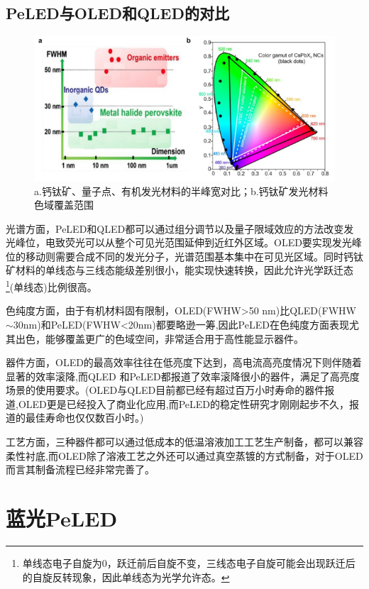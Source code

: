 \documentclass{phyasgn}\usepackage{nag}
\begin{document}
\subsection{PeLED与OLED和QLED的对比}
\begin{figure}[H]
	\centering
	\hspace{2em}\includegraphics[width=.8\linewidth]{pic/3.png}
	\caption{a.钙钛矿、量子点、有机发光材料的半峰宽对比；b.钙钛矿发光材料色域覆盖范围\cite{yakunin2015low}
	}
\end{figure}
\par 光谱方面，PeLED和QLED都可以通过组分调节以及量子限域效应的方法改变发光峰位，电致荧光可以从整个可见光范围延伸到近红外区域。OLED要实现发光峰位的移动则需要合成不同的发光分子，光谱范围基本集中在可见光区域。同时钙钛矿材料的单线态与三线态能级差别很小，能实现快速转换，因此允许光学跃迁态\footnote{单线态电子自旋为0，跃迁前后自旋不变，三线态电子自旋可能会出现跃迁后的自旋反转现象，因此单线态为光学允许态。}(单线态)比例很高。
\par 色纯度方面，由于有机材料固有限制，OLED(FWHW>50 nm)比QLED(FWHW$\sim$30nm)和PeLED(FWHW<20nm)都要略逊一筹,因此PeLED在色纯度方面表现尤其出色，能够覆盖更广的色域空间，非常适合用于高性能显示器件。
\par 器件方面，OLED的最高效率往往在低亮度下达到，高电流高亮度情况下则伴随着显著的效率滚降,而QLED 和PeLED都报道了效率滚降很小的器件，满足了高亮度场景的使用要求。(OLED与QLED目前都已经有超过百万小时寿命的器件报道,OLED更是已经投入了商业化应用,而PeLED的稳定性研究才刚刚起步不久，报道的最佳寿命也仅仅数百小时\cite{wang2019trifluoroacetate}。)
\par 工艺方面，三种器件都可以通过低成本的低温溶液加工工艺生产制备，都可以兼容柔性衬底,而OLED除了溶液工艺之外还可以通过真空蒸镀的方式制备，对于OLED而言其制备流程已经非常完善了。
\clearpage
\section{蓝光PeLED}
\end{document}
